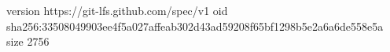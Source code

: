 version https://git-lfs.github.com/spec/v1
oid sha256:33508049903ee4f5a027affeab302d43ad59208f65bf1298b5e2a6a6de558e5a
size 2756
